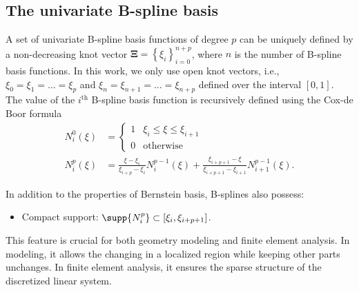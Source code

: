\subsection{The univariate B-spline basis}

A set of univariate B-spline basis functions of degree $p$ can be uniquely defined by a non-decreasing knot vector $\mathbf{\Xi}=\left\{\xi_i\right\}_{i=0}^{n+p}$, where $n$ is the number of B-spline basis functions. In this work, we only use open knot vectors, i.e., $\xi_0=\xi_1=\dots=\xi_{p}$ and $\xi_{n}=\xi_{n+1}=\dots=\xi_{n+p}$ defined over the interval $\left[0,1\right]$. The value of the $i^{\text{th}}$ B-spline basis function is recursively defined using the Cox-de Boor formula~\cite{piegl2012nurbs}
\begin{align}
    N_{i}^0(\xi) & =\begin{cases}1 & \xi_i\leq{\xi}\leq{\xi_{i+1}}\\0 & \text{otherwise} \end{cases}                                                                                          \\
    N_{i}^p(\xi) & =\frac{\xi-\xi_i}{\xi_{i+p}-\xi_i}N_{i}^{p-1}(\xi)+\frac{\xi_{i+p+1}-\xi}{\xi_{i+p+1}-\xi_{i+1}}N_{i+1}^{p-1}(\xi).
\end{align}

In addition to the properties of Bernstein basis, B-splines also possess:
\begin{itemize}
    \item Compact support: $\supp{N_{i}^p}\subset \left[\xi_i,\xi_{i+p+1}\right]$.
\end{itemize}
This feature is crucial for both geometry modeling and finite element analysis. In modeling, it allows the changing in a localized region while keeping other parts unchanges. In finite element analysis, it ensures the sparse structure of the discretized linear system.

